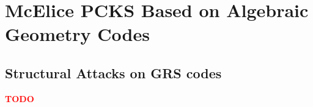 \section{McElice PCKS Based on Algebraic Geometry Codes}

\subsection{Structural Attacks on GRS codes}%
\textcolor{red}{\textbf{TODO}}
\label{subsec:label}

